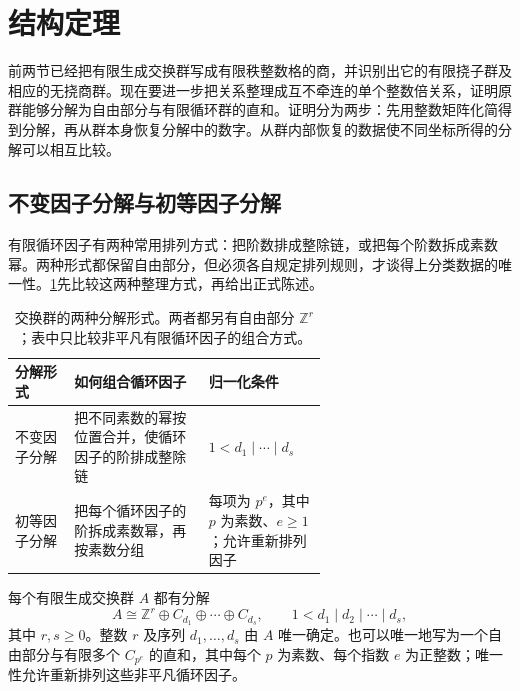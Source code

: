 
\section{结构定理}
\label{b1:sec:0903}

前两节已经把有限生成交换群写成有限秩整数格的商，并识别出它的有限挠子群及相应的无挠商群。现在要进一步把关系整理成互不牵连的单个整数倍关系，证明原群能够分解为自由部分与有限循环群的直和。证明分为两步：先用整数矩阵化简得到分解，再从群本身恢复分解中的数字。从群内部恢复的数据使不同坐标所得的分解可以相互比较。

%
%

\subsection{不变因子分解与初等因子分解}
\label{b1:subsec:0903:01}

有限循环因子有两种常用排列方式：把阶数排成整除链，或把每个阶数拆成素数幂。两种形式都保留自由部分，但必须各自规定排列规则，才谈得上分类数据的唯一性。\cref{b1:tab:fga-decomposition-forms}先比较这两种整理方式，再给出正式陈述。

\begin{table}[H]
	\centering
	\caption[交换群的两种分解形式]{交换群的两种分解形式。两者都另有自由部分 \(\mathbb Z^r\)；表中只比较非平凡有限循环因子的组合方式。}
	\label{b1:tab:fga-decomposition-forms}
	\begin{tabularx}{\linewidth}{@{}>{\raggedright\arraybackslash}p{0.19\linewidth}>{\raggedright\arraybackslash}p{0.43\linewidth}>{\raggedright\arraybackslash}X@{}}
		\toprule
		分解形式 & 如何组合循环因子 & 归一化条件 \\
		\midrule
		不变因子分解 & 把不同素数的幂按位置合并，使循环因子的阶排成整除链 & \(1<d_1\mid\cdots\mid d_s\) \\
		\addlinespace
		初等因子分解 & 把每个循环因子的阶拆成素数幂，再按素数分组 & 每项为 \(p^e\)，其中 \(p\) 为素数、\(e\ge1\)；允许重新排列因子 \\
		\bottomrule
	\end{tabularx}
\end{table}

\begin{theorem}[有限生成交换群的结构定理]\label{b1:thm:fga-structure}
	每个有限生成交换群 \(A\) 都有分解
	\[
		A\cong\mathbb Z^r\oplus C_{d_1}\oplus\cdots\oplus C_{d_s}, \qquad 1<d_1\mid d_2\mid\cdots\mid d_s,
	\]
	其中 \(r,s\ge0\)。整数 \(r\) 及序列 \(d_1,\ldots,d_s\) 由 \(A\) 唯一确定。也可以唯一地写为一个自由部分与有限多个 \(C_{p^e}\) 的直和，其中每个 \(p\) 为素数、每个指数 \(e\) 为正整数；唯一性允许重新排列这些非平凡循环因子。
\end{theorem}

